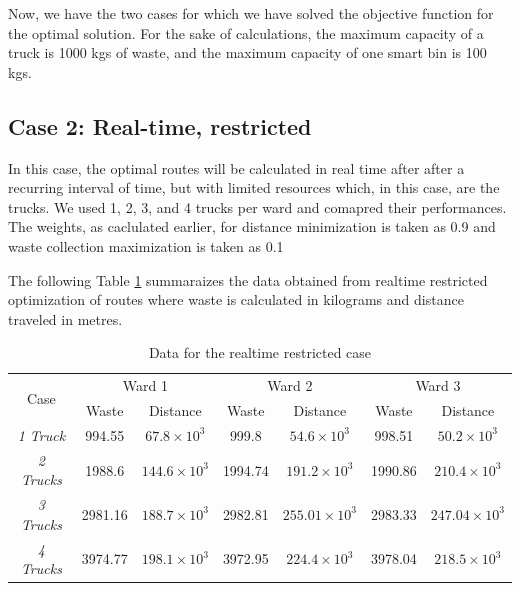 \documentclass[12pt]{article}
\begin{document}
Now, we have the two cases for which we have solved the objective function for the optimal solution. For the sake of calculations, the maximum capacity of a truck is 1000 kgs of waste, and the maximum capacity of one smart bin is 100 kgs.

\subsection*{Case 2: Real-time, restricted}
In this case, the optimal routes will be calculated in real time after after a recurring interval of time, but with limited resources which, in this case, are the trucks. We used 1, 2, 3, and 4 trucks per ward and comapred their performances. The weights, as caclulated earlier, for distance minimization is taken as 0.9 and waste collection maximization is taken as 0.1

The following Table \ref{tab1} summaraizes the data obtained from realtime restricted optimization of routes where waste is calculated in kilograms and distance traveled in metres.
\begin{table}[H]
    \centering
    \caption{Data for the realtime restricted case} \label{tab1}
    \vspace*{0.3cm}
    \begin{tabular}{|c|c|c|c|c|c|c|}
        \hline \multirow{2}{*}{Case} & \multicolumn{2}{c|}{Ward 1} & \multicolumn{2}{c|}{Ward 2} & \multicolumn{2}{c|}{Ward 3}\\
        \cline{2-7}& Waste  & Distance & Waste & Distance & Waste & Distance\\ 
        \hline \textit{1 Truck} & 994.55 & $67.8\times10^3$ & 999.8 & $54.6\times10^3$ & 998.51 & $50.2\times10^3$ \\
        \hline \textit{2 Trucks} & 1988.6 & $144.6\times10^3$ & 1994.74 & $191.2\times10^3$ & 1990.86 & $210.4\times10^3$ \\
        \hline \textit{3 Trucks} & 2981.16 & $188.7\times10^3$ & 2982.81 & $255.01\times10^3$ & 2983.33 & $247.04\times10^3$ \\
        \hline \textit{4 Trucks} & 3974.77 & $198.1\times10^3$ & 3972.95 & $224.4\times10^3$ & 3978.04 & $218.5\times10^3$ \\
        \hline
    \end{tabular}
\end{table}
\end{document}
